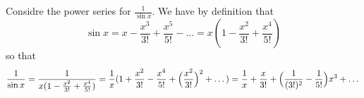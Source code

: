 \begin{example}\label{example_2.2}
    Considre the power series for $\frac{1}{\sin{x}}$. We have by definition
    that
    \begin{equation*}
        \sin{x}=x-\frac{x^3}{3!}+\frac{x^5}{5!}-\dots
        =x(1-\frac{x^2}{3!}+\frac{x^4}{5!})
    \end{equation*}
    so that
    \begin{equation*}
        \frac{1}{\sin{x}}=\frac{1}{x(1-\frac{x^2}{3!}+\frac{x^4}{5!})}=
        \frac{1}{x}(1+\frac{x^2}{3!}-\frac{x^4}{5!}+
        \Big{(}\frac{x^2}{3!}\Big{)}^2+\dots)=
        \frac{1}{x}+\frac{x}{3!}+\Big{(}\frac{1}{(3!)^2}-\frac{1}{5!}\Big{)}x^3+\dots
    \end{equation*}
\end{example}
